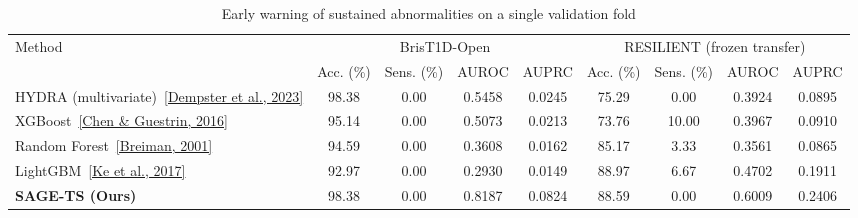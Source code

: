 \documentclass[10pt]{article}
\newcommand{\methodcite}[3]{\href{#3}{[#2]}}
\begin{document}
\setcounter{table}{0}
\begin{table}[!ht]
\providecommand{\methodcite}[3]{\cite{#1}}
\centering\small
\caption{Early warning of sustained abnormalities on a single validation fold}
\label{tab:guidance-results}
\begin{tabular*}{\textwidth}{@{\extracolsep{\fill}}l*{8}{c}@{}}
\toprule
\multirow{2}{*}{Method} & \multicolumn{4}{c}{BrisT1D-Open} & \multicolumn{4}{c}{RESILIENT (frozen transfer)} \\
\cmidrule(lr){2-5}\cmidrule(l){6-9}
 & Acc. (\%) & Sens. (\%) & AUROC & AUPRC & Acc. (\%) & Sens. (\%) & AUROC & AUPRC \\
\midrule
HYDRA (multivariate)~\methodcite{dempster2023}{Dempster et al., 2023}{https://doi.org/10.1007/s10618-023-00939-3} & 98.38 & 0.00 & 0.5458 & 0.0245 & 75.29 & 0.00 & 0.3924 & 0.0895 \\
XGBoost~\methodcite{chen2016}{Chen \& Guestrin, 2016}{https://doi.org/10.1145/2939672.2939785} & 95.14 & 0.00 & 0.5073 & 0.0213 & 73.76 & 10.00 & 0.3967 & 0.0910 \\
Random Forest~\methodcite{breiman2001}{Breiman, 2001}{https://doi.org/10.1023/A:1010933404324} & 94.59 & 0.00 & 0.3608 & 0.0162 & 85.17 & 3.33 & 0.3561 & 0.0865 \\
LightGBM~\methodcite{ke2017}{Ke et al., 2017}{https://papers.nips.cc/paper/6907-lightgbm-a-highly-efficient-gradient-boosting-decision-tree} & 92.97 & 0.00 & 0.2930 & 0.0149 & 88.97 & 6.67 & 0.4702 & 0.1911 \\
\textbf{SAGE-TS (Ours)} & 98.38 & 0.00 & 0.8187 & 0.0824 & 88.59 & 0.00 & 0.6009 & 0.2406 \\
\bottomrule
\end{tabular*}
\end{table}
\end{document}
